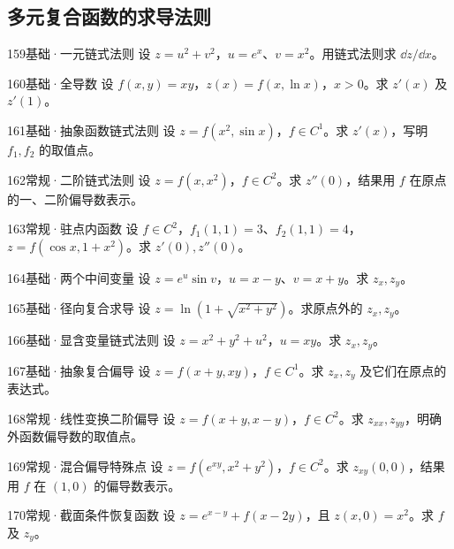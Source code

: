 \subsection{多元复合函数的求导法则}
\begin{exercise}{159}{基础·一元链式法则}
设 $z=u^2+v^2$，$u=e^x$、$v=x^2$。用链式法则求 $\dd z/\dd x$。
\end{exercise}
\begin{exercise}{160}{基础·全导数}
设 $f(x,y)=xy$，$z(x)=f(x,\ln x)$，$x>0$。求 $z'(x)$ 及 $z'(1)$。
\end{exercise}
\begin{exercise}{161}{基础·抽象函数链式法则}
设 $z=f(x^2,\sin x)$，$f\in C^1$。求 $z'(x)$，写明 $f_1,f_2$ 的取值点。
\end{exercise}
\begin{exercise}{162}{常规·二阶链式法则}
设 $z=f(x,x^2)$，$f\in C^2$。求 $z''(0)$，结果用 $f$ 在原点的一、二阶偏导数表示。
\end{exercise}
\begin{exercise}{163}{常规·驻点内函数}
设 $f\in C^2$，$f_1(1,1)=3$、$f_2(1,1)=4$，$z=f(\cos x,1+x^2)$。求 $z'(0),z''(0)$。
\end{exercise}
\begin{exercise}{164}{基础·两个中间变量}
设 $z=e^u\sin v$，$u=x-y$、$v=x+y$。求 $z_x,z_y$。
\end{exercise}
\begin{exercise}{165}{基础·径向复合求导}
设 $z=\ln(1+\sqrt{x^2+y^2})$。求原点外的 $z_x,z_y$。
\end{exercise}
\begin{exercise}{166}{基础·显含变量链式法则}
设 $z=x^2+y^2+u^2$，$u=xy$。求 $z_x,z_y$。
\end{exercise}
\begin{exercise}{167}{基础·抽象复合偏导}
设 $z=f(x+y,xy)$，$f\in C^1$。求 $z_x,z_y$ 及它们在原点的表达式。
\end{exercise}
\begin{exercise}{168}{常规·线性变换二阶偏导}
设 $z=f(x+y,x-y)$，$f\in C^2$。求 $z_{xx},z_{yy}$，明确外函数偏导数的取值点。
\end{exercise}
\begin{exercise}{169}{常规·混合偏导特殊点}
设 $z=f(e^{xy},x^2+y^2)$，$f\in C^2$。求 $z_{xy}(0,0)$，结果用 $f$ 在 $(1,0)$ 的偏导数表示。
\end{exercise}
\begin{exercise}{170}{常规·截面条件恢复函数}
设 $z=e^{x-y}+f(x-2y)$，且 $z(x,0)=x^2$。求 $f$ 及 $z_y$。
\end{exercise}
